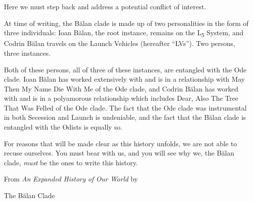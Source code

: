   Here we must step back and address a potential conflict of interest.

  At time of writing, the Bălan clade is made up of two personalities in the form of three individuals: Ioan Bălan, the root instance, remains on the L\textsubscript{5} System, and Codrin Bălan travels on the Launch Vehicles (hereafter “LVs”). Two persons, three instances.

  Both of these persons, all of three of these instances, are entangled with the Ode clade. Ioan Bălan has worked extensively with and is in a relationship with May Then My Name Die With Me of the Ode clade, and Codrin Bălan has worked with and is in a polyamorous relationship which includes Dear, Also The Tree That Was Felled of the Ode clade. The fact that the Ode clade was instrumental in both Secession and Launch is undeniable, and the fact that the Bălan clade is entangled with the Odists is equally so.

  For reasons that will be made clear as this history unfolds, we are not able to recuse ourselves. You must bear with us, and you will see why we, the Bălan clade, \emph{must} be the ones to write this history.

  \vspace{1em}

  From \emph{An Expanded History of Our World} by

  The Bălan Clade

  \vfill








% 


